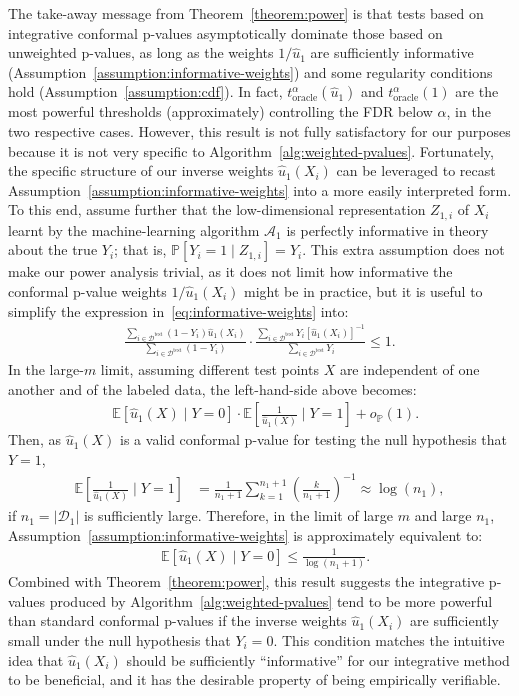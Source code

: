 \documentclass[11pt]{article}
\renewcommand{\P}[1]{\mathbb{P}\left[#1\right]}
\newcommand{\E}[1]{\mathbb{E}\left[#1\right]}
\begin{document}
The take-away message from Theorem~\ref{theorem:power} is that tests based on integrative conformal p-values asymptotically dominate those based on unweighted p-values, as long as the weights $1/\hat{u}_1$ are sufficiently informative (Assumption~\ref{assumption:informative-weights}) and some regularity conditions hold (Assumption~\ref{assumption:cdf}). In fact, $t^{\alpha}_{\mathrm{oracle}}(\hat{u}_1)$ and $t^{\alpha}_{\mathrm{oracle}}(1)$ are the most powerful thresholds (approximately) controlling the FDR below $\alpha$, in the two respective cases.
However, this result is not fully satisfactory for our purposes because it is not very specific to Algorithm~\ref{alg:weighted-pvalues}.
Fortunately, the specific structure of our inverse weights $\hat{u}_1(X_i)$ can be leveraged to recast Assumption~\ref{assumption:informative-weights} into a more easily interpreted form.
To this end, assume further that the low-dimensional representation $Z_{1,i}$ of $X_i$ learnt by the machine-learning algorithm $\mathcal{A}_1$ is perfectly informative in theory about the true $Y_i$; that is, $\P{Y_i=1 \mid Z_{1,i}} = Y_i$.
This extra assumption does not make our power analysis trivial, as it does not limit how informative the conformal p-value weights $1/\hat{u}_1(X_i)$ might be in practice, but it is useful to simplify the expression in~\eqref{eq:informative-weights} into:
\begin{align*}
  \frac{\sum_{i \in \mathcal{D}^{\mathrm{test}}} (1-Y_i) \hat{u}_1(X_{i})}{\sum_{i \in \mathcal{D}^{\mathrm{test}}}{ (1-Y_i) }} \cdot
  \frac{\sum_{i \in \mathcal{D}^{\mathrm{test}}} Y_i  [\hat{u}_1(X_{i})]^{-1}}{\sum_{i \in \mathcal{D}^{\mathrm{test}}}{ Y_i}}
  \leq 1.
\end{align*}
In the large-$m$ limit, assuming different test points $X$ are independent of one another and of the labeled data, the left-hand-side above becomes:
\begin{align*}
  & \E{\hat{u}_1(X) \mid Y = 0} \cdot \E{\frac{1}{\hat{u}_1(X)} \mid Y = 1} + o_{\mathbb{P}}(1).
\end{align*}
Then, as $\hat{u}_1(X)$ is a valid conformal p-value for testing the null hypothesis that $Y=1$,
\begin{align*}
  \E{\frac{1}{\hat{u}_1(X)} \mid Y = 1}
  & = \frac{1}{n_1+1} \sum_{k=1}^{n_1+1} \left( \frac{k}{n_1+1} \right)^{-1} \approx \log(n_1),
\end{align*}
if $n_1 = |\mathcal{D}_1|$ is sufficiently large.
Therefore, in the limit of large $m$ and large $n_1$, Assumption~\ref{assumption:informative-weights} is approximately equivalent to:
\begin{align} \label{eq:informative-weights-simple}
  & \E{\hat{u}_1(X) \mid Y = 0} \leq \frac{1}{\log(n_1+1)}.
\end{align}
Combined with Theorem~\ref{theorem:power}, this result suggests the integrative p-values produced by Algorithm~\ref{alg:weighted-pvalues} tend to be more powerful than standard conformal p-values if the inverse weights $\hat{u}_1(X_i)$ are sufficiently small under the null hypothesis that $Y_i=0$.
This condition matches the intuitive idea that $\hat{u}_1(X_i)$ should be sufficiently ``informative'' for our integrative method to be beneficial, and it has the desirable property of being empirically verifiable.
\end{document}
